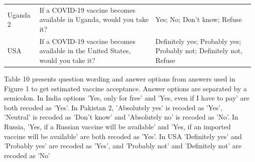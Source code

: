 \documentclass[
  12pt,
]{article}
\begin{document}
\begin{table}[!h]
{\begin{threeparttable}
\begin{tabular}[t]{>{\raggedright\arraybackslash}p{8em}>{\raggedright\arraybackslash}p{30em}>{\raggedright\arraybackslash}p{20em}}
Uganda 2 & If a COVID-19 vaccine becomes available in Uganda, would you take it? & Yes; No; Don't know; Refuse\\
USA & If a COVID-19 vaccine becomes available in the United States, would you take it? & Definitely yes; Probably yes; Probably not; Definitely not, Refuse\\
\bottomrule
\end{tabular}
\begin{tablenotes}
\item Table 10 presents question wording and answer options from answers used in Figure 1 to get estimated vaccine acceptance. Answer options are separated by a semicolon. In India options 'Yes, only for free' and 'Yes, even if I have to pay' are both recoded as 'Yes'. In Pakistan 2, 'Absolutely yes' is recoded as 'Yes', 'Neutral' is recoded as 'Don't know' and 'Absolutely no' is recoded as 'No'. In Russia, 'Yes, if a Russian vaccine will be available' and 'Yes, if an imported vaccine will be available' are both recoded as 'Yes'. In USA 'Definitely yes' and 'Probably yes' are recoded as 'Yes', and 'Probably not' and 'Definitely not' are recoded as 'No'
\end{tablenotes}
\end{threeparttable}}
\end{table}
\end{document}
